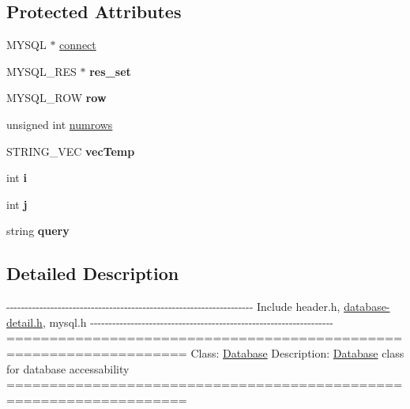\subsection*{\-Protected \-Attributes}
\begin{DoxyCompactItemize}
\item 
\-M\-Y\-S\-Q\-L $\ast$ \hyperlink{classDatabase_aa232b806b05ef654cd5579bca5f1dbad}{connect}
\item 
\hypertarget{classDatabase_ad5921cd2f70d0c22895f2cc5542ab4d7}{\-M\-Y\-S\-Q\-L\-\_\-\-R\-E\-S $\ast$ {\bfseries res\-\_\-set}}\label{classDatabase_ad5921cd2f70d0c22895f2cc5542ab4d7}

\item 
\hypertarget{classDatabase_a71ad7ae59677936d2ca6666f9de9df40}{\-M\-Y\-S\-Q\-L\-\_\-\-R\-O\-W {\bfseries row}}\label{classDatabase_a71ad7ae59677936d2ca6666f9de9df40}

\item 
unsigned int \hyperlink{classDatabase_a02965883689dd1d8007c86cebf6df89e}{numrows}
\item 
\hypertarget{classDatabase_a88f3a0df87e5e40207100d5b1f7ee6b1}{\-S\-T\-R\-I\-N\-G\-\_\-\-V\-E\-C {\bfseries vec\-Temp}}\label{classDatabase_a88f3a0df87e5e40207100d5b1f7ee6b1}

\item 
\hypertarget{classDatabase_a1b3174ab4ae9b3cb80448d48817375be}{int {\bfseries i}}\label{classDatabase_a1b3174ab4ae9b3cb80448d48817375be}

\item 
\hypertarget{classDatabase_a5b4fd605238ca66878959f5f3ba647f2}{int {\bfseries j}}\label{classDatabase_a5b4fd605238ca66878959f5f3ba647f2}

\item 
\hypertarget{classDatabase_a851daa5b233ce54d75873631b7b2167a}{string {\bfseries query}}\label{classDatabase_a851daa5b233ce54d75873631b7b2167a}

\end{DoxyCompactItemize}


\subsection{\-Detailed \-Description}
-\/-\/-\/-\/-\/-\/-\/-\/-\/-\/-\/-\/-\/-\/-\/-\/-\/-\/-\/-\/-\/-\/-\/-\/-\/-\/-\/-\/-\/-\/-\/-\/-\/-\/-\/-\/-\/-\/-\/-\/-\/-\/-\/-\/-\/-\/-\/-\/-\/-\/-\/-\/-\/-\/-\/-\/-\/-\/-\/-\/-\/-\/-\/-\/-\/-\/-\/ \-Include header.\-h, \hyperlink{database-detail_8h_source}{database-\/detail.\-h}, mysql.\-h -\/-\/-\/-\/-\/-\/-\/-\/-\/-\/-\/-\/-\/-\/-\/-\/-\/-\/-\/-\/-\/-\/-\/-\/-\/-\/-\/-\/-\/-\/-\/-\/-\/-\/-\/-\/-\/-\/-\/-\/-\/-\/-\/-\/-\/-\/-\/-\/-\/-\/-\/-\/-\/-\/-\/-\/-\/-\/-\/-\/-\/-\/-\/-\/-\/-\/ =================================================================== \-Class\-: \hyperlink{classDatabase}{\-Database} \-Description\-: \hyperlink{classDatabase}{\-Database} class for database accessability =================================================================== 

